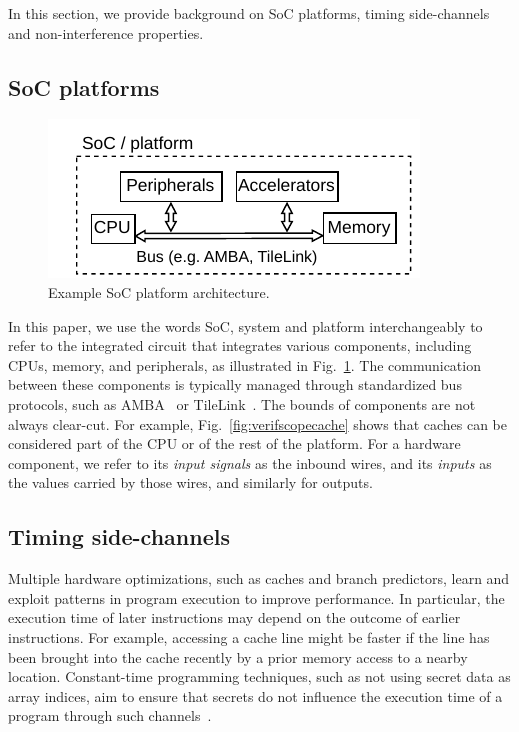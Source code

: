 In this section, we provide background on SoC platforms, timing side-channels and non-interference properties.

\subsection{SoC platforms}

\begin{figure}[t]
    \begin{center}
    \includegraphics[width=0.8\columnwidth]{figures/exampleplatform/exampleplatform.pdf}
    \end{center}
    \vspace*{-1em}
    \caption{\label{fig:exampleplatform}
        Example SoC platform architecture.
    }
    \vspace*{-1em}
\end{figure}

In this paper, we use the words SoC, system and platform interchangeably to refer to the integrated circuit that integrates various components, including CPUs, memory, and peripherals, as illustrated in Fig.~\ref{fig:exampleplatform}.
The communication between these components is typically managed through standardized bus protocols, such as AMBA~\cite{arm_amba} or TileLink~\cite{tilelink_spec}.
The bounds of components are not always clear-cut.
For example, Fig.~\ref{fig:verifscopecache} shows that caches can be considered part of the CPU or of the rest of the platform.
For a hardware component, we refer to its \emph{input signals} as the inbound wires, and its \emph{inputs} as the values carried by those wires, and similarly for outputs.

\subsection{Timing side-channels}

Multiple hardware optimizations, such as caches and branch predictors, learn and exploit patterns in program execution to improve performance.
In particular, the execution time of later instructions may depend on the outcome of earlier instructions.
For example, accessing a cache line might be faster if the line has been brought into the cache recently by a prior memory access to a nearby location.
Constant-time programming techniques, such as not using secret data as array indices, aim to ensure that secrets do not influence the execution time of a program through such channels~\cite{OsvikShamirTromer2006CacheAES,AlmeidaEtAl2016CTVerif}.

